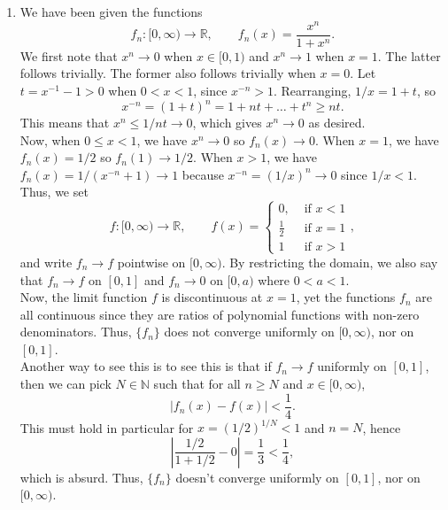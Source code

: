 \documentclass[10pt]{article}
\def\R{\mathbb{R}}
\def\N{\mathbb{N}}
\begin{document}
\begin{enumerate}
        \item We have been given the functions \[
            f_n\colon [0, \infty) \to \R, \qquad f_n(x) = \frac{x^n}{1 + x^n}.
        \] We first note that $x^n \to 0$ when $x \in [0, 1)$ and $x^n \to 1$ 
        when $x = 1$. The latter follows trivially. The former also follows
        trivially when $x = 0$. Let $t = x^{-1} - 1 > 0$ when $0 < x < 1$, since
        $x^{-n} > 1$. Rearranging, $1 /x = 1 + t$, so \[
            x^{-n} = (1 + t)^n = 1 + nt + \dots + t^n \geq nt.
        \] This means that $x^n \leq 1 / nt \to 0$, which gives $x^n \to 0$ as
        desired. \\

        Now, when $0 \leq x < 1$, we have $x^n \to 0$ so $f_n(x) \to 0$.
        When $x = 1$, we have $f_n(x) = 1 /2$ so $f_n(1) \to 1 /2$.
        When $x > 1$, we have $f_n(x) = 1 / (x^{-n} + 1) \to 1$ because $x^{-n} = (1
        / x)^n \to 0$ since $1 / x < 1$.
        Thus, we set \[
            f\colon [0, \infty) \to \R, \qquad f(x) = \begin{cases}
                0, &\text{ if } x < 1 \\
                \frac{1}{2} &\text{ if } x = 1 \\
                1 &\text{ if } x > 1
            \end{cases},
        \] and write $f_n \to f$ pointwise on $[0, \infty)$. By restricting the 
        domain, we also say that $f_n \to f$ on $[0, 1]$ and $f_n \to 0$ on $[0, a)$
        where $0 < a < 1$. \\

        Now, the limit function $f$ is discontinuous at $x = 1$, yet the functions
        $f_n$ are all continuous since they are ratios of polynomial functions with
        non-zero denominators. Thus, $\{f_n\}$ does not converge uniformly on $[0,
        \infty)$, nor on $[0, 1]$. \\

        Another way to see this is to see this is that if $f_n \to f$ uniformly on
        $[0, 1]$, then we can pick $N \in \N$ such that for all $n \geq N$
        and $x \in [0, \infty)$, \[
            |f_n(x) - f(x)| < \frac{1}{4}.
        \] This must hold in particular for $x = (1 / 2)^{1 / N} < 1$ and $n = N$,
        hence \[
            \left|\frac{1 / 2}{1 + 1 / 2} - 0 \right| = \frac{1}{3} < \frac{1}{4},
        \] which is absurd. Thus, $\{f_n\}$ doesn't converge uniformly on $[0, 1]$,
        nor on $[0, \infty)$. \\


\end{enumerate}
\end{document}

